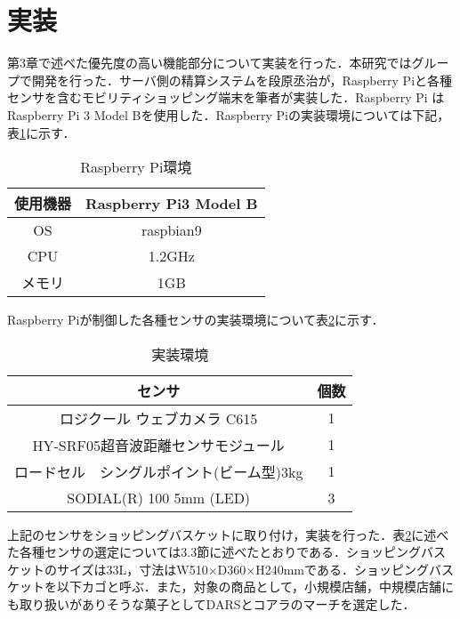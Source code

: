 

\section{実装}

第3章で述べた優先度の高い機能部分について実装を行った．本研究ではグループで開発を行った．サーバ側の精算システムを段原丞治が，Raspberry Piと各種センサを含むモビリティショッピング端末を筆者が実装した．Raspberry Pi はRaspberry Pi 3 Model Bを使用した．Raspberry Piの実装環境については下記，表\ref{rasp}に示す．


\begin{table}[htb]
\begin{center}
\caption{Raspberry Pi環境}
\begin{tabular}{|c||c|} \hline
使用機器 & Raspberry Pi3 Model B \\ \hline
OS & raspbian9 \\ \hline
CPU & 1.2GHz \\ \hline
メモリ & 1GB \\ \hline
\end{tabular}
\label{rasp}
\end{center}
\end{table}


Raspberry Piが制御した各種センサの実装環境について表\ref{jissou}に示す．


\begin{table}[htb]
\begin{center}
\caption{実装環境}
\begin{tabular}{|c|c|} \hline
センサ & 個数 \\ \hline \hline
ロジクール ウェブカメラ C615 & 1 \\
HY-SRF05超音波距離センサモジュール & 1 \\
ロードセル　シングルポイント(ビーム型)3kg & 1 \\
SODIAL(R) 100 5mm (LED) & 3 \\ \hline
\end{tabular}
\label{jissou}
\end{center}
\end{table}


上記のセンサをショッピングバスケットに取り付け，実装を行った．表\ref{jissou}に述べた各種センサの選定については3.3節に述べたとおりである．ショッピングバスケットのサイズは33L，寸法はW510×D360×H240mmである．ショッピングバスケットを以下カゴと呼ぶ．また，対象の商品として，小規模店舗，中規模店舗にも取り扱いがありそうな菓子としてDARSとコアラのマーチを選定した．

